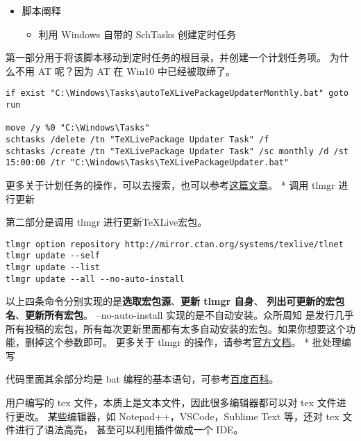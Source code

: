 \begin{itemize}

\item
  脚本阐释

  \begin{itemize}

  \item
    利用 Windows 自带的 SchTasks 创建定时任务
  \end{itemize}
\end{itemize}

第一部分用于将该脚本移动到定时任务的根目录，并创建一个计划任务项。
为什么不用 AT 呢？因为 AT 在 Win10 中已经被取缔了。

\begin{verbatim}
if exist "C:\Windows\Tasks\autoTeXLivePackageUpdaterMonthly.bat" goto run

move /y %0 "C:\Windows\Tasks"
schtasks /delete /tn "TeXLivePackage Updater Task" /f
schtasks /create /tn "TeXLivePackage Updater Task" /sc monthly /d /st 15:00:00 /tr "C:\Windows\Tasks\TeXLivePackageUpdater.bat"
\end{verbatim}

更多关于计划任务的操作，可以去搜索，也可以参考\href{https://www.flighty.cn/html/tutorial/20170406_442.html}{这篇文章}。
* 调用 tlmgr 进行更新

第二部分是调用 tlmgr 进行更新TeXLive宏包。

\begin{verbatim}
tlmgr option repository http://mirror.ctan.org/systems/texlive/tlnet
tlmgr update --self
tlmgr update --list
tlmgr update --all --no-auto-install
\end{verbatim}

以上四条命令分别实现的是\textbf{选取宏包源}、\textbf{更新 tlmgr 自身}、
\textbf{列出可更新的宏包名}、\textbf{更新所有宏包}。
--no-auto-install 实现的是不自动安装。众所周知 \TeXLive{}
是发行几乎所有投稿的宏包，所有每次更新里面都有太多自动安装的宏包。如果你想要这个功能，删掉这个参数即可。
更多关于 tlmgr 的操作，请参考\href{https://www.tug.org/texlive/doc/tlmgr.html}{官方文档}。
* 批处理编写

代码里面其余部分均是 bat
编程的基本语句，可参考\href{https://baike.baidu.com/item/\%E6\%89\%B9\%E5\%A4\%84\%E7\%90\%86/1448600?fr=aladdin}{百度百科}。



用户编写的 tex 文件，本质上是文本文件，因此很多编辑器都可以对 tex 文件进行更改。
某些编辑器，如 Notepad++，VSCode，Sublime Text 等，还对 tex 文件进行了语法高亮，
甚至可以利用插件做成一个 IDE。

